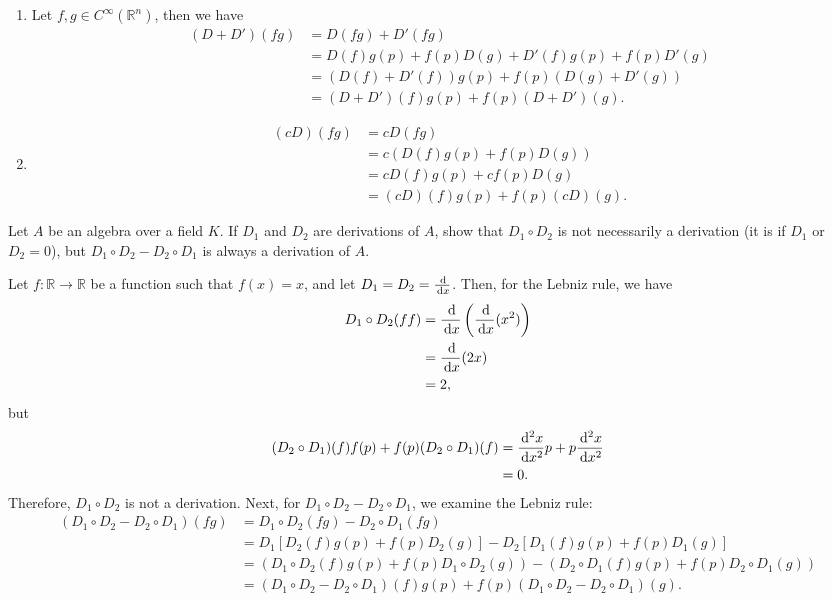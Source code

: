 \documentclass[en, oneside]{vivi}
\begin{document}
\begin{sol}
    \begin{enumerate}[label=(\alph*)]
        \item Let $f, g \in C^\infty(\mathbb{R}^n)$, then we have
        \begin{align*}
            (D + D')(fg) &= D(fg) + D'(fg)\\
            &= D(f)g(p) + f(p)D(g) + D'(f)g(p) + f(p)D'(g)\\
            &= (D(f) + D'(f))g(p) + f(p)(D(g) + D'(g))\\
            &= (D + D')(f)g(p) + f(p)(D + D')(g).
        \end{align*}
        \item \begin{align*}
            (cD)(fg) &= cD(fg)\\
            &= c(D(f)g(p) + f(p)D(g))\\
            &= cD(f)g(p) + cf(p)D(g)\\
            &= (cD)(f)g(p) + f(p)(cD)(g).
        \end{align*}
    \end{enumerate}
\end{sol}

\begin{prob}
    Let $A$ be an algebra over a field $K$. If $D_1$ and $D_2$ are derivations of $A$, show that $D_1 \circ D_2$ is not necessarily a derivation (it is if $D_1$ or $D_2 = 0$), but $D_1 \circ D_2 - D_2 \circ D_1$ is always a derivation of $A$.
\end{prob}

\begin{sol}
    Let $f: \mathbb{R} \to \mathbb{R}$ be a function such that $f(x) = x$, and let $D_1 = D_2 = \frac{\dif}{\dif x}$. Then, for the Lebniz rule, we have
    \begin{align*}
        D_1 \circ D_2(f f) &= \frac{\dif}{\dif x} \left( \frac{\dif}{\dif x} (x^2) \right)\\
        &= \frac{\dif}{\dif x} (2x)\\
        &= 2,
    \end{align*}
    but
    \begin{align*}
        (D_2 \circ D_1)(f)f(p) + f(p)(D_2 \circ D_1)(f) &= \frac{\dif^2 x}{\dif x^2} p + p \frac{\dif^2 x}{\dif x^2}\\
        &= 0.
    \end{align*}
    Therefore, $D_1 \circ D_2$ is not a derivation.
    Next, for $D_1 \circ D_2 - D_2 \circ D_1$, we examine the Lebniz rule:
    \begin{align*}
        (D_1 \circ D_2 - D_2 \circ D_1)(f g) &= D_1 \circ D_2(f g) - D_2 \circ D_1(f g)\\
        &= D_1[D_2(f)g(p) + f(p)D_2(g)] - D_2[D_1(f)g(p) + f(p)D_1(g)]\\
        &= (D_1 \circ D_2(f)g(p) + f(p)D_1 \circ D_2(g)) - (D_2 \circ D_1(f)g(p) + f(p)D_2 \circ D_1(g))\\
        &= (D_1 \circ D_2 - D_2 \circ D_1)(f)g(p) + f(p)(D_1 \circ D_2 - D_2 \circ D_1)(g).
    \end{align*}
\end{sol}
\end{document}
